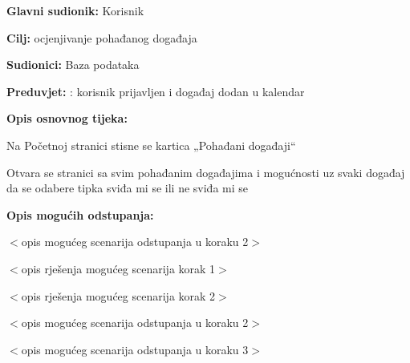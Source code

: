 	\noindent {}
\begin{packed_item}
	
	\item \textbf{Glavni sudionik: }Korisnik
	\item  \textbf{Cilj:} ocjenjivanje pohađanog događaja
	\item  \textbf{Sudionici:}
	Baza podataka
	\item  \textbf{Preduvjet:} : korisnik prijavljen i događaj dodan u kalendar
	\item  \textbf{Opis osnovnog tijeka:}
	
	\item[] \begin{packed_enum}
		
		\item	Na Početnoj stranici stisne se kartica „Pohađani događaji“
		\item	Otvara se stranici sa svim pohađanim događajima i mogućnosti uz svaki događaj da se odabere tipka sviđa mi se ili ne sviđa mi se
		
	\end{packed_enum}
	
	\item  \textbf{Opis mogućih odstupanja:}
	
	\item[] \begin{packed_item}
		
		\item[2.a] $<$opis mogućeg scenarija odstupanja u koraku 2$>$
		\item[] \begin{packed_enum}
			
			\item $<$opis rješenja mogućeg scenarija korak 1$>$
			\item $<$opis rješenja mogućeg scenarija korak 2$>$
			
		\end{packed_enum}
		\item[2.b] $<$opis mogućeg scenarija odstupanja u koraku 2$>$
		\item[3.a] $<$opis mogućeg scenarija odstupanja  u koraku 3$>$
		
	\end{packed_item}
\end{packed_item}

